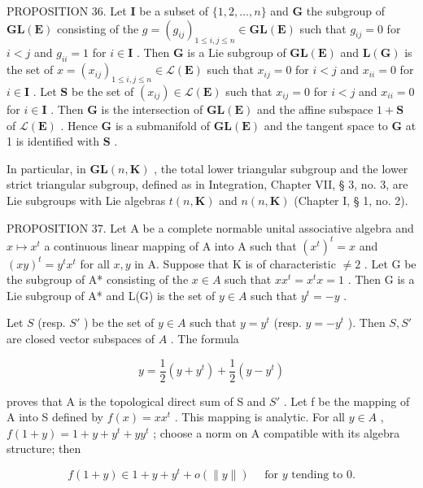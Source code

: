 PROPOSITION 36. Let \(\mathbf{I}\) be a subset of \(\{1,2,\ldots,n\}\) and \(\mathbf{G}\) the subgroup of \(\mathbf{GL}(\mathbf{E})\) consisting of the \(g = (g_{ij})_{1\leqslant i,j\leqslant n}\in \mathbf{GL}(\mathbf{E})\) such that \(g_{ij} = 0\) for \(i < j\) and \(g_{ii} = 1\) for \(i\in \mathbf{I}\) . Then \(\mathbf{G}\) is a Lie subgroup of \(\mathbf{GL}(\mathbf{E})\) and \(\mathbf{L}(\mathbf{G})\) is the set of \(x = (x_{ij})_{1\leqslant i,j\leqslant n}\in \mathcal{L}(\mathbf{E})\) such that \(x_{ij} = 0\) for \(i < j\) and \(x_{ii} = 0\) for \(i\in \mathbf{I}\) . Let \(\mathbf{S}\) be the set of \((x_{ij})\in \mathcal{L}(\mathbf{E})\) such that \(x_{ij} = 0\) for \(i < j\) and \(x_{ii} = 0\) for \(i\in \mathbf{I}\) . Then \(\mathbf{G}\) is the intersection of \(\mathbf{GL}(\mathbf{E})\) and the affine subspace \(1 + \mathbf{S}\) of \(\mathcal{L}(\mathbf{E})\) . Hence \(\mathbf{G}\) is a submanifold of \(\mathbf{GL}(\mathbf{E})\) and the tangent space to \(\mathbf{G}\) at 1 is identified with \(\mathbf{S}\) .

In particular, in \(\mathbf{GL}(n,\mathbf{K})\) , the total lower triangular subgroup and the lower strict triangular subgroup, defined as in Integration, Chapter VII, § 3, no. 3, are Lie subgroups with Lie algebras \(t(n,\mathbf{K})\) and \(n(n,\mathbf{K})\) (Chapter I, § 1, no. 2).

PROPOSITION 37. Let A be a complete normable unital associative algebra and \(x \mapsto x^t\) a continuous linear mapping of A into A such that \((x^t)^t = x\) and \((xy)^t = y^t x^t\) for all \(x, y\) in A. Suppose that K is of characteristic \(\neq 2\) . Let G be the subgroup of A* consisting of the \(x \in A\) such that \(xx^t = x^t x = 1\) . Then G is a Lie subgroup of A* and L(G) is the set of \(y \in A\) such that \(y^t = -y\) .

Let \(S\) (resp. \(S'\) ) be the set of \(y \in A\) such that \(y = y^t\) (resp. \(y = -y^t\) ). Then \(S, S'\) are closed vector subspaces of \(A\) . The formula

\[
y = \frac {1}{2} (y + y ^ {t}) + \frac {1}{2} (y - y ^ {t})
\]

proves that A is the topological direct sum of S and \(S'\) . Let f be the mapping of A into S defined by \(f(x) = xx^{t}\) . This mapping is analytic. For all \(y \in A\) , \(f(1 + y) = 1 + y + y^{t} + yy^{t}\) ; choose a norm on A compatible with its algebra structure; then

\[
f (1 + y) \in 1 + y + y ^ {t} + o (\| y \|) \quad \text { for   } y \text {   tending   to   } 0.
\]

